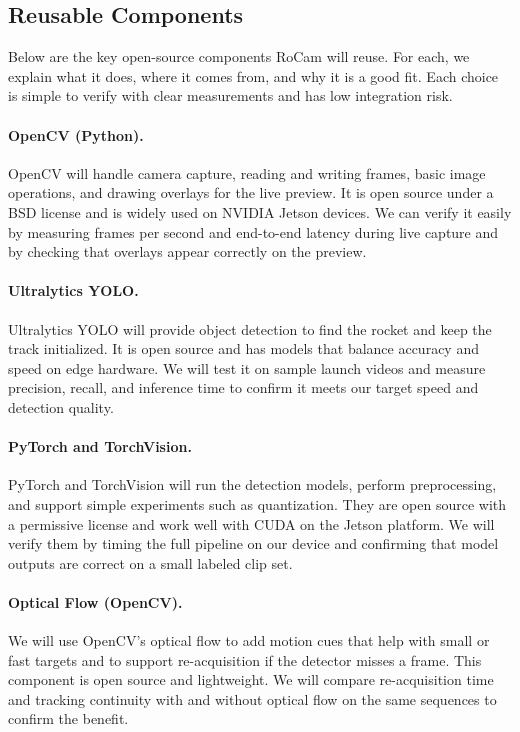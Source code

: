 \documentclass[12pt]{article}
\begin{document}
\subsection{Reusable Components}
\label{sec:reusable-components}

Below are the key open-source components RoCam will reuse. For each, we explain
what it does, where it comes from, and why it is a good fit. Each choice is
simple to verify with clear measurements and has low integration risk.

\paragraph{OpenCV (Python).}
OpenCV will handle camera capture, reading and writing frames, basic image
operations, and drawing overlays for the live preview. It is open source under
a BSD license and is widely used on NVIDIA Jetson devices. We can verify it
easily by measuring frames per second and end-to-end latency during live
capture and by checking that overlays appear correctly on the preview.

\paragraph{Ultralytics YOLO.}
Ultralytics YOLO will provide object detection to find the rocket and keep the
track initialized. It is open source and has models that balance accuracy and
speed on edge hardware. We will test it on sample launch videos and measure
precision, recall, and inference time to confirm it meets our target speed and
detection quality.

\paragraph{PyTorch and TorchVision.}
PyTorch and TorchVision will run the detection models, perform preprocessing,
and support simple experiments such as quantization. They are open source with
a permissive license and work well with CUDA on the Jetson platform. We will
verify them by timing the full pipeline on our device and confirming that model
outputs are correct on a small labeled clip set.

\paragraph{Optical Flow (OpenCV).}
We will use OpenCV’s optical flow to add motion cues that help with small or
fast targets and to support re-acquisition if the detector misses a frame. This
component is open source and lightweight. We will compare re-acquisition time
and tracking continuity with and without optical flow on the same sequences to
confirm the benefit.
\end{document}
